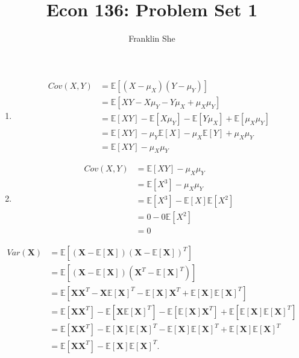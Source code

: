 \documentclass[10pt]{article}
\newcommand{\E}{\mathbb{E}}
\newenvironment{problem}[2][Problem]{\begin{trivlist}
\item[\hskip \labelsep {\bfseries #1}\hskip \labelsep {\bfseries #2.}]}{\end{trivlist}}
\begin{document}
\title{\vspace{-2cm} Econ 136: Problem Set 1}
\author{Franklin She}

\maketitle
 
\begin{problem}{1}
    \hfill
    \begin{enumerate}
        \item \hfill
                \begin{align*}
                    Cov(X, Y) &= \E[(X - \mu_X)(Y - \mu_Y)] \\
                    &= \E[XY - X\mu_Y - Y\mu_X + \mu_X\mu_Y] \\
                    &= \E[XY] - \E[X\mu_Y] - \E[Y\mu_X] + \E[\mu_X\mu_Y] \\
                    &= \E[XY] - \mu_Y\E[X] - \mu_X\E[Y] + \mu_X\mu_Y \\
                    &= \E[XY] - \mu_X\mu_Y
                \end{align*}
        \item \hfill
                \begin{align*}
                    Cov(X, Y) &= \E[XY] - \mu_X\mu_Y \\
                    &= \E[X^3] - \mu_X\mu_Y \\
                    &= \E[X^3] - \E[X]\E[X^2] \\
                    &= 0 - 0 \E[X^2] \\
                    &= 0
                \end{align*}
    \end{enumerate}
\end{problem}

\begin{problem}{2}
    \hfill
    \begin{align*}
        Var(\mathbf{X}) &= \E[(\mathbf{X} - \E[\mathbf{X}])(\mathbf{X} - \E[\mathbf{X}])^T] \\
                        &=\E[(\mathbf{X} - \E[\mathbf{X}])(\mathbf{X}^T - \E[\mathbf{X}]^T)] \\
                        &= \E[\mathbf{X}\mathbf{X}^T - \mathbf{X}\E[\mathbf{X}]^T - \E[\mathbf{X}]\mathbf{X}^T + \E[\mathbf{X}]\E[\mathbf{X}]^T] \\
                        &= \E[\mathbf{X}\mathbf{X}^T] - \E[\mathbf{X}\E[\mathbf{X}]^T] - \E[\E[\mathbf{X}]\mathbf{X}^T] + \E[\E[\mathbf{X}]\E[\mathbf{X}]^T] \\
                        &= \E[\mathbf{X}\mathbf{X}^T] - \E[\mathbf{X}]\E[\mathbf{X}]^T - \E[\mathbf{X}]\E[\mathbf{X}]^T + \E[\mathbf{X}]\E[\mathbf{X}]^T \\
                        &= \E[\mathbf{X}\mathbf{X}^T] - \E[\mathbf{X}]\E[\mathbf{X}]^T.
    \end{align*}



\end{problem}
\end{document}
